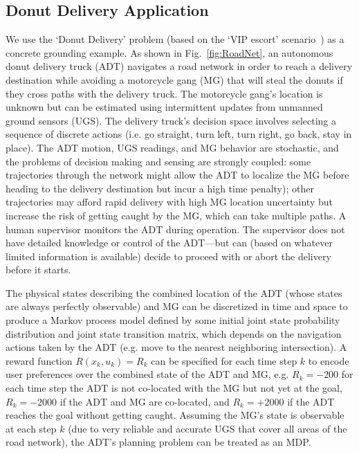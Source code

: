 \subsection{Donut Delivery Application} \label{sec:donut_delivery}
We use the `Donut Delivery' problem (based on the `VIP escort' scenario~\cite{Humphrey2012-lr}) as a concrete grounding example. As shown in Fig.~\ref{fig:RoadNet}, an autonomous donut delivery truck (ADT) navigates a road network in order to reach a delivery destination while avoiding a motorcycle gang (MG) that will steal the donuts if they cross paths with the delivery truck. The motorcycle gang's location is unknown but can be estimated using intermittent updates from unmanned ground sensors (UGS). The delivery truck's decision space involves selecting a sequence of discrete actions (i.e. go straight, turn left, turn right, go back, stay in place). The ADT motion, UGS readings, and MG behavior are stochastic, and the problems of decision making and sensing are strongly coupled: some trajectories through the network might allow the ADT to localize the MG before heading to the delivery destination but incur a high time penalty); other trajectories may afford rapid delivery with high MG location uncertainty but increase the risk of getting caught by the MG, which can take multiple paths. A human supervisor monitors the ADT during operation. The supervisor does not have detailed knowledge or control of the ADT---but can  (based on whatever limited information is available) decide to proceed with or abort the delivery before it starts. 

The physical states describing the combined location of the ADT (whose states are always perfectly observable) and MG can be discretized in time and space to produce a Markov process model defined by some initial joint state probability distribution and joint state transition matrix, which depends on the navigation actions taken by the ADT (e.g. move to the nearest neighboring intersection).
A reward function $R(x_k,u_k) = R_k$ can be specified for each time step $k$ to encode user preferences over the combined state of the ADT and MG, e.g. $R_k = -200$ for each time step the ADT is not co-located with the MG but not yet at the goal, $R_k= -2000$ if the ADT and MG are co-located, and $R_k=+2000$ if the ADT reaches the goal without getting caught. 
Assuming the MG's state is observable at each step $k$ (due to very reliable and accurate UGS that cover all areas of the road network), the ADT's planning problem can be treated as an MDP. 


